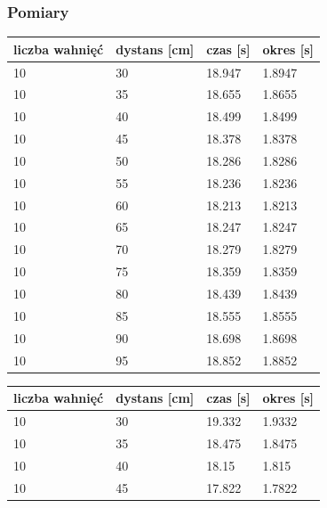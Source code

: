 \documentclass[a4paper, 11pt]{article}
\begin{document}
\subsubsection{Pomiary}
\begin{adjustwidth}{-0.125\textwidth}{-0.125\textwidth}
	\begin{center}
		\begin{tabular}{|l|l|l|l|}
			\hline
			liczba wahnięć & dystans [cm] & czas [s] & okres [s] \\ \hline
			10             & 30           & 18.947   & 1.8947    \\ \hline
			10             & 35           & 18.655   & 1.8655    \\ \hline
			10             & 40           & 18.499   & 1.8499    \\ \hline
			10             & 45           & 18.378   & 1.8378    \\ \hline
			10             & 50           & 18.286   & 1.8286    \\ \hline
			10             & 55           & 18.236   & 1.8236    \\ \hline
			10             & 60           & 18.213   & 1.8213    \\ \hline
			10             & 65           & 18.247   & 1.8247    \\ \hline
			10             & 70           & 18.279   & 1.8279    \\ \hline
			10             & 75           & 18.359   & 1.8359    \\ \hline
			10             & 80           & 18.439   & 1.8439    \\ \hline
			10             & 85           & 18.555   & 1.8555    \\ \hline
			10             & 90           & 18.698   & 1.8698    \\ \hline
			10             & 95           & 18.852   & 1.8852    \\ \hline
		\end{tabular}
		\begin{tabular}{|l|l|l|l|}
			\hline
			liczba wahnięć & dystans [cm] & czas [s] & okres [s] \\ \hline
			10             & 30           & 19.332   & 1.9332    \\ \hline
			10             & 35           & 18.475   & 1.8475    \\ \hline
			10             & 40           & 18.15    & 1.815     \\ \hline
			10             & 45           & 17.822   & 1.7822    \\ \hline

\end{tabular}
\end{center}
\end{adjustwidth}
\end{document}
